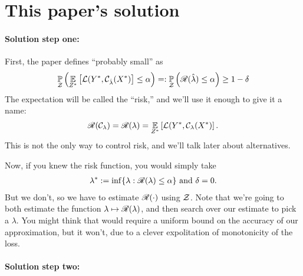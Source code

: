 \documentclass[twoside,11pt]{article}
\numberwithin{equation}{section}
\begin{document}
\section{This paper's solution}

\paragraph{Solution step one: } 
First, the paper defines ``probably small'' as
%
\begin{align*}
%
\p{\calset}{
    \expect{\znew}{\loss(\ynew, \cfun_{\lambdahat}(\xnew)} \le \alpha
} =:
\p{\calset}{\risk(\lambdahat) \le \alpha}
\ge 1 - \delta
%
\end{align*}
%
The expectation will be called the ``risk,'' and we'll use it enough
to give it a name:
%
\begin{align*}
%
\risk(\cfun_\lambda) = \risk(\lambda) =
    \expect{\znew}{\loss(\ynew, \cfun_{\lambda}(\xnew)}.
%
\end{align*}
%
This is not the only way to control risk, and we'll talk later
about alternatives.

Now, if you knew the risk function, you would simply take
%
\begin{align*}
    \lambda^{*} := \inf \{ \lambda: \mathscr{R}(\lambda) \le \alpha \}
    \textrm{ and }\delta = 0.
\end{align*}
%
But we don't, so we have to estimate $\mathscr{R}(\cdot)$ using $\mathcal{Z}$. Note that
we're going to both estimate the function $\lambda \mapsto \mathscr{R}(\lambda)$, and
then search over our estimate to pick a $\lambda$.  You might think that would
require a uniform bound on the accuracy of our approximation, but it won't, due
to a clever expolitation of monotonicity of the loss.


\paragraph{Solution step two: } 
\end{document}

